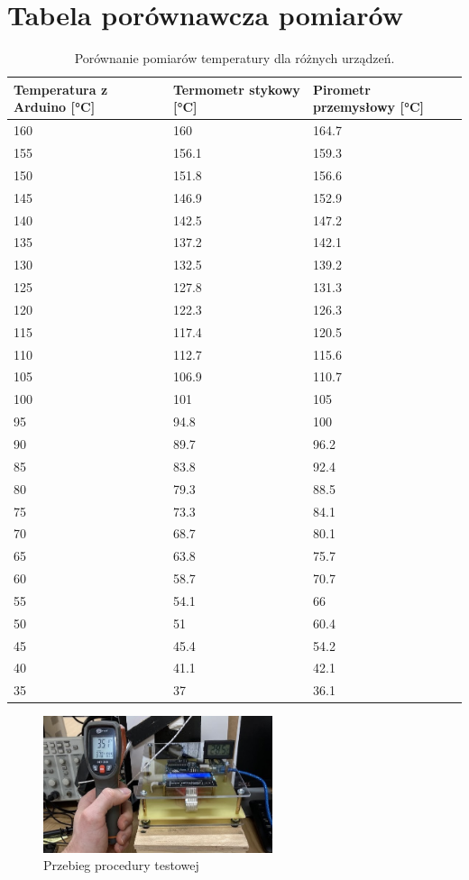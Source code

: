 \section{Tabela porównawcza pomiarów}
\begin{table}[h!]
\centering
\begin{tabularx}{\textwidth}{|X|X|X|}
\hline
\textbf{Temperatura z Arduino [°C]} & \textbf{Termometr stykowy [°C]} & \textbf{Pirometr przemysłowy [°C]} \\
\hline
160 & 160 & 164.7 \\
\hline
155 & 156.1 & 159.3 \\
\hline
150 & 151.8 & 156.6 \\
\hline
145 & 146.9 & 152.9 \\
\hline
140 & 142.5 & 147.2 \\
\hline
135 & 137.2 & 142.1 \\
\hline
130 & 132.5 & 139.2 \\
\hline
125 & 127.8 & 131.3 \\
\hline
120 & 122.3 & 126.3 \\
\hline
115 & 117.4 & 120.5 \\
\hline
110 & 112.7 & 115.6 \\
\hline
105 & 106.9 & 110.7 \\
\hline
100 & 101 & 105 \\
\hline
95 & 94.8 & 100 \\
\hline
90 & 89.7 & 96.2 \\
\hline
85 & 83.8 & 92.4 \\
\hline
80 & 79.3 & 88.5 \\
\hline
75 & 73.3 & 84.1 \\
\hline
70 & 68.7 & 80.1 \\
\hline
65 & 63.8 & 75.7 \\
\hline
60 & 58.7 & 70.7 \\
\hline
55 & 54.1 & 66 \\
\hline
50 & 51 & 60.4 \\
\hline
45 & 45.4 & 54.2 \\
\hline
40 & 41.1 & 42.1 \\
\hline
35 & 37 & 36.1 \\
\hline
\end{tabularx}
\caption{Porównanie pomiarów temperatury dla różnych urządzeń.}
\label{tab:pomiary}
\end{table}
\begin{figure}[h!]
    \centering
    \includegraphics[width=0.6\textwidth]{images/test.jpg}
    \caption{Przebieg procedury testowej}
    \label{fig:panel_gorny}
\end{figure}